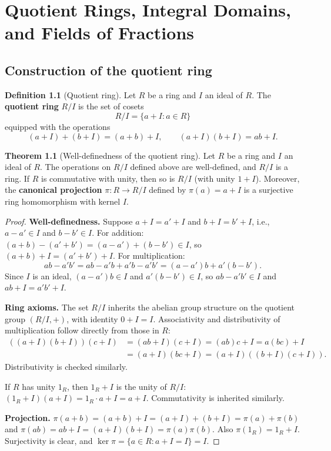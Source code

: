 \documentclass[12pt,a4paper,openany]{book}
\theoremstyle{definition}
\newtheorem{definition}{Definition}[chapter]
\newtheorem{theorem}{Theorem}[chapter]
\theoremstyle{remark}
\begin{document}
\chapter{Quotient Rings, Integral Domains, and Fields of Fractions}\label{ch:quotient-rings}

\section{Construction of the quotient ring}\label{sec:quotient-ring-construction}

\begin{definition}[Quotient ring]\label{def:quotient-ring}
Let $R$ be a ring and $I$ an ideal of $R$. The \textbf{quotient ring} $R/I$ is the set of cosets
\[
    R/I = \{a+I : a\in R\}
\]
equipped with the operations
\[
    (a+I)+(b+I) = (a+b)+I,\qquad (a+I)(b+I) = ab+I.
\]
\end{definition}

\begin{theorem}[Well-definedness of the quotient ring]\label{thm:quotient-ring-welldef}
Let $R$ be a ring and $I$ an ideal of $R$. The operations on $R/I$ defined above are well-defined, and $R/I$ is a ring. If $R$ is commutative with unity, then so is $R/I$ (with unity $1+I$). Moreover, the \textbf{canonical projection} $\pi\colon R\to R/I$ defined by $\pi(a)=a+I$ is a surjective ring homomorphism with kernel $I$.
\end{theorem}

\begin{proof}
\textbf{Well-definedness.} Suppose $a+I=a'+I$ and $b+I=b'+I$, i.e., $a-a'\in I$ and $b-b'\in I$. For addition: $(a+b)-(a'+b')=(a-a')+(b-b')\in I$, so $(a+b)+I=(a'+b')+I$. For multiplication:
\[
    ab-a'b' = ab-a'b+a'b-a'b' = (a-a')b+a'(b-b').
\]
Since $I$ is an ideal, $(a-a')b\in I$ and $a'(b-b')\in I$, so $ab-a'b'\in I$ and $ab+I=a'b'+I$.

\textbf{Ring axioms.} The set $R/I$ inherits the abelian group structure on the quotient group $(R/I,+)$, with identity $0+I=I$. Associativity and distributivity of multiplication follow directly from those in $R$:
\begin{align*}
    ((a+I)(b+I))(c+I) &= (ab+I)(c+I) = (ab)c+I = a(bc)+I \\
    &= (a+I)(bc+I) = (a+I)((b+I)(c+I)).
\end{align*}
Distributivity is checked similarly.

If $R$ has unity $1_R$, then $1_R+I$ is the unity of $R/I$: $(1_R+I)(a+I)=1_R\cdot a+I=a+I$. Commutativity is inherited similarly.

\textbf{Projection.} $\pi(a+b)=(a+b)+I=(a+I)+(b+I)=\pi(a)+\pi(b)$ and $\pi(ab)=ab+I=(a+I)(b+I)=\pi(a)\pi(b)$. Also $\pi(1_R)=1_R+I$. Surjectivity is clear, and $\ker\pi=\{a\in R : a+I=I\}=I$.
\end{proof}
\end{document}
